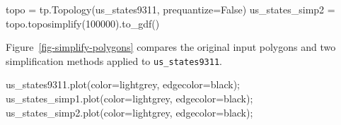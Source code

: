 \documentclass[
  letterpaper,
]{krantz}
\newenvironment{Shaded}{\begin{snugshade}}{\end{snugshade}}
\newcommand{\DecValTok}[1]{\textcolor[rgb]{0.68,0.00,0.00}{#1}}
\newcommand{\NormalTok}[1]{\textcolor[rgb]{0.00,0.23,0.31}{#1}}
\newcommand{\OperatorTok}[1]{\textcolor[rgb]{0.37,0.37,0.37}{#1}}
\newcommand{\StringTok}[1]{\textcolor[rgb]{0.13,0.47,0.30}{#1}}
\newcommand{\VariableTok}[1]{\textcolor[rgb]{0.07,0.07,0.07}{#1}}
\begin{document}
\begin{Shaded}
\begin{Highlighting}[]
\NormalTok{topo }\OperatorTok{=}\NormalTok{ tp.Topology(us\_states9311, prequantize}\OperatorTok{=}\VariableTok{False}\NormalTok{)}
\NormalTok{us\_states\_simp2 }\OperatorTok{=}\NormalTok{ topo.toposimplify(}\DecValTok{100000}\NormalTok{).to\_gdf()}
\end{Highlighting}
\end{Shaded}

Figure~\ref{fig-simplify-polygons} compares the original input polygons
and two simplification methods applied to \texttt{us\_states9311}.

\begin{Shaded}
\begin{Highlighting}[]
\NormalTok{us\_states9311.plot(color}\OperatorTok{=}\StringTok{\textquotesingle{}lightgrey\textquotesingle{}}\NormalTok{, edgecolor}\OperatorTok{=}\StringTok{\textquotesingle{}black\textquotesingle{}}\NormalTok{)}\OperatorTok{;}
\NormalTok{us\_states\_simp1.plot(color}\OperatorTok{=}\StringTok{\textquotesingle{}lightgrey\textquotesingle{}}\NormalTok{, edgecolor}\OperatorTok{=}\StringTok{\textquotesingle{}black\textquotesingle{}}\NormalTok{)}\OperatorTok{;}
\NormalTok{us\_states\_simp2.plot(color}\OperatorTok{=}\StringTok{\textquotesingle{}lightgrey\textquotesingle{}}\NormalTok{, edgecolor}\OperatorTok{=}\StringTok{\textquotesingle{}black\textquotesingle{}}\NormalTok{)}\OperatorTok{;}
\end{Highlighting}
\end{Shaded}
\end{document}
